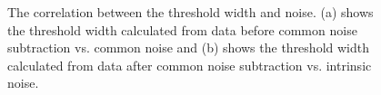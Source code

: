 \documentclass[preprint,sort&compress,12pt]{elsarticle}
\begin{document}
\begin{figure}[!ht]
\centering
{}
\hspace{2mm}
\caption{The correlation between the threshold width and noise. (a) shows the threshold width calculated from data before common noise subtraction vs. common noise and (b) shows the threshold width calculated from data after common noise subtraction vs. intrinsic noise.}\label{fig:threshold_width_noise}
\end{figure}
\end{document}
